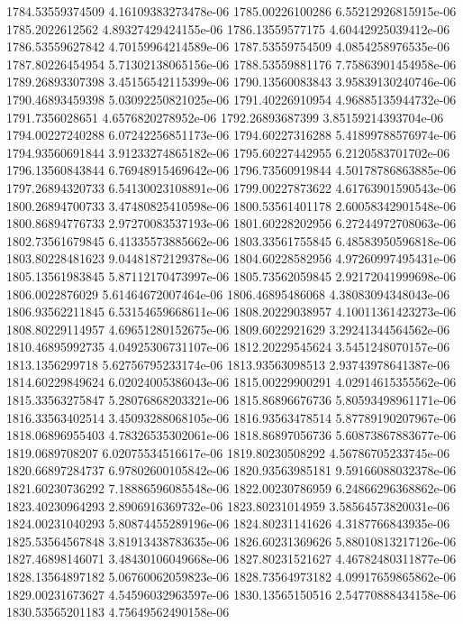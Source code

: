 {1784.53559374509 4.16109383273478e-06
1785.00226100286 6.55212926815915e-06
1785.2022612562 4.89327429424155e-06
1786.13559577175 4.60442925039412e-06
1786.53559627842 4.70159964214589e-06
1787.53559754509 4.0854258976535e-06
1787.80226454954 5.71302138065156e-06
1788.53559881176 7.75863901454958e-06
1789.26893307398 3.45156542115399e-06
1790.13560083843 3.95839130240746e-06
1790.46893459398 5.03092250821025e-06
1791.40226910954 4.96885135944732e-06
1791.7356028651 4.6576820278952e-06
1792.26893687399 3.85159214393704e-06
1794.00227240288 6.07242256851173e-06
1794.60227316288 5.41899788576974e-06
1794.93560691844 3.91233274865182e-06
1795.60227442955 6.2120583701702e-06
1796.13560843844 6.76948915469642e-06
1796.73560919844 4.50178786863885e-06
1797.26894320733 6.54130023108891e-06
1799.00227873622 4.61763901590543e-06
1800.26894700733 3.47480825410598e-06
1800.53561401178 2.60058342901548e-06
1800.86894776733 2.97270083537193e-06
1801.60228202956 6.27244972708063e-06
1802.73561679845 6.41335573885662e-06
1803.33561755845 6.48583950596818e-06
1803.80228481623 9.04481872129378e-06
1804.60228582956 4.97260997495431e-06
1805.13561983845 5.87112170473997e-06
1805.73562059845 2.92172041999698e-06
1806.0022876029 5.61464672007464e-06
1806.46895486068 4.38083094348043e-06
1806.93562211845 6.53154659668611e-06
1808.20229038957 4.10011361423273e-06
1808.80229114957 4.69651280152675e-06
1809.6022921629 3.29241344564562e-06
1810.46895992735 4.04925306731107e-06
1812.20229545624 3.5451248070157e-06
1813.1356299718 5.62756795233174e-06
1813.93563098513 2.93743978641387e-06
1814.60229849624 6.02024005386043e-06
1815.00229900291 4.02914615355562e-06
1815.33563275847 5.28076868203321e-06
1815.86896676736 5.80593498961171e-06
1816.33563402514 3.45093288068105e-06
1816.93563478514 5.87789190207967e-06
1818.06896955403 4.78326535302061e-06
1818.86897056736 5.60873867883677e-06
1819.0689708207 6.02075534516617e-06
1819.80230508292 4.56786705233745e-06
1820.66897284737 6.97802600105842e-06
1820.93563985181 9.59166088032378e-06
1821.60230736292 7.18886596085548e-06
1822.00230786959 6.24866296368862e-06
1823.40230964293 2.8906916369732e-06
1823.80231014959 3.58564573820031e-06
1824.00231040293 5.80874455289196e-06
1824.80231141626 4.3187766843935e-06
1825.53564567848 3.81913438783635e-06
1826.60231369626 5.88010813217126e-06
1827.46898146071 3.48430106049668e-06
1827.80231521627 4.46782480311877e-06
1828.13564897182 5.06760062059823e-06
1828.73564973182 4.09917659865862e-06
1829.00231673627 4.54596032963597e-06
1830.13565150516 2.54770888434158e-06
1830.53565201183 4.75649562490158e-06
}
